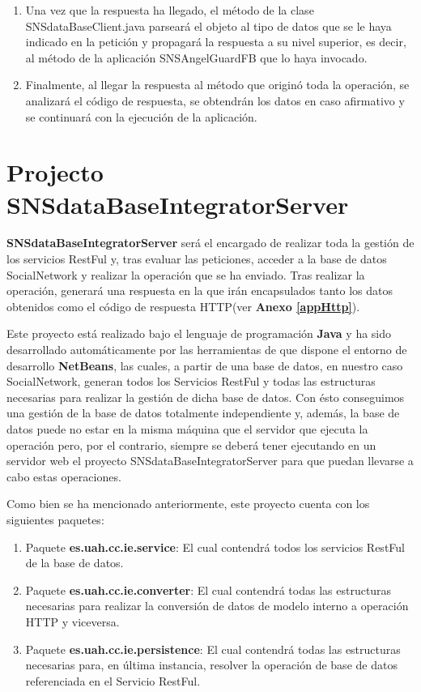 \begin{enumerate}
\begin{enumerate}
\end{enumerate}
\item Una vez que la respuesta ha llegado, el método de la clase SNSdataBaseClient.java parseará el objeto al tipo de datos que se le haya indicado en la petición y propagará la respuesta a su nivel superior, es decir, al método de la aplicación SNSAngelGuardFB que lo haya invocado.
\item Finalmente, al llegar la respuesta al método que originó toda la operación, se analizará el código de respuesta, se obtendrán los datos en caso afirmativo y se continuará con la ejecución de la aplicación.
\end{enumerate}

\section{Projecto SNSdataBaseIntegratorServer}
\textbf{SNSdataBaseIntegratorServer} será el encargado de realizar toda la gestión de los servicios RestFul y, tras evaluar las peticiones, acceder a la base de datos SocialNetwork y realizar la operación que se ha enviado. Tras realizar la operación, generará una respuesta en la que irán encapsulados tanto los datos obtenidos como el código de respuesta HTTP(ver \textbf{Anexo \ref{appHttp}}).
\bigskip
\par
Este proyecto está realizado bajo el lenguaje de programación \textbf{Java} y ha sido desarrollado automáticamente por las herramientas de que dispone el entorno de desarrollo \textbf{NetBeans}, las cuales, a partir de una base de datos, en nuestro caso SocialNetwork, generan todos los Servicios RestFul y todas las estructuras necesarias para realizar la gestión de dicha base de datos. Con ésto conseguimos una gestión de la base de datos totalmente independiente y, además, la base de datos puede no estar en la misma máquina que el servidor que ejecuta la operación pero, por el contrario, siempre se deberá tener ejecutando en un servidor web el proyecto SNSdataBaseIntegratorServer para que puedan llevarse a cabo estas operaciones.
\bigskip
\par
Como bien se ha mencionado anteriormente, este proyecto cuenta con los siguientes paquetes:
\begin{enumerate}
\item Paquete \textbf{es.uah.cc.ie.service}: El cual contendrá todos los servicios RestFul de la base de datos.
\item Paquete \textbf{es.uah.cc.ie.converter}: El cual contendrá todas las estructuras necesarias para realizar la conversión de datos de modelo interno a operación HTTP y viceversa.
\item Paquete \textbf{es.uah.cc.ie.persistence}: El cual contendrá todas las estructuras necesarias para, en última instancia, resolver la operación de base de datos referenciada en el Servicio RestFul. 
\end{enumerate}
